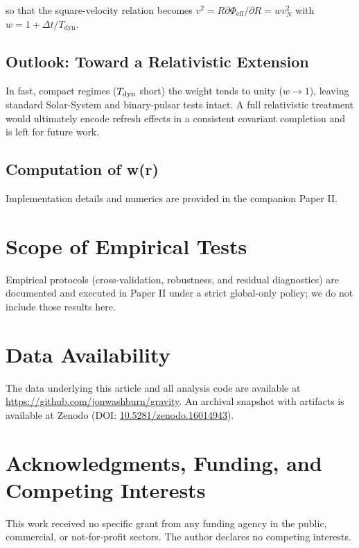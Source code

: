 \documentclass[usenatbib]{mnras}
\begin{document}
so that the square-velocity relation becomes $v^2 = R \partial\Phi_{\text{eff}}/\partial R = w v_N^2$ with $w = 1 + \Delta t/T_{\text{dyn}}$.

\subsection{Outlook: Toward a Relativistic Extension}

In fast, compact regimes ($T_{\rm dyn}$ short) the weight tends to unity ($w\to 1$), leaving standard Solar-System and binary-pulsar tests intact. A full relativistic treatment would ultimately encode refresh effects in a consistent covariant completion and is left for future work.

\subsection{Computation of w(r)}

Implementation details and numerics are provided in the companion Paper II.

\section{Scope of Empirical Tests}
Empirical protocols (cross-validation, robustness, and residual diagnostics) are documented and executed in Paper II under a strict global-only policy; we do not include those results here.

\section*{Data Availability}

The data underlying this article and all analysis code are available at \href{https://github.com/jonwashburn/gravity}{https://github.com/jonwashburn/gravity}. An archival snapshot with artifacts is available at Zenodo (DOI: \href{https://doi.org/10.5281/zenodo.16014943}{10.5281/zenodo.16014943}).

\section*{Acknowledgments, Funding, and Competing Interests}

This work received no specific grant from any funding agency in the public, commercial, or not-for-profit sectors. The author declares no competing interests.



\end{document}
